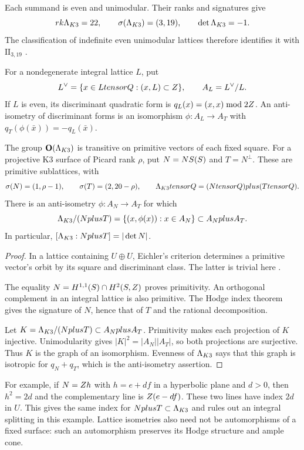 \begin{verification}[K3 invariants]
\label{ver:K3-invariants}
Each summand is even and unimodular.  Their ranks and signatures give
\[
rk\Lambda_{K3}=22,\qquad
\sigma(\Lambda_{K3})=(3,19),\qquad \det\Lambda_{K3}=-1.
\]
The classification of indefinite even unimodular lattices therefore
identifies it with $\mathrm{II}_{3,19}$
\cite[Chapter~14, \S1]{HuybrechtsK3}.
\end{verification}

For a nondegenerate integral lattice $L$, put
\[
L^\vee=\{x\in LtensorQ:(x,L)\subset Z\},\qquad A_L=L^\vee/L.
\]
If $L$ is even, its discriminant quadratic form is
$q_L(x)=(x,x)\bmod 2Z$.  An anti-isometry of discriminant forms
is an isomorphism $\phi:A_L\to A_T$ with
$q_T(\phi(\bar x))=-q_L(\bar x)$.

\begin{proposition}
\label{prop:K3-aut}
The group $\mathbf{O}(\Lambda_{K3})$ is transitive on primitive vectors of each
fixed square.  For a projective K3 surface of Picard rank $\rho$,
put $N=NS(S)$ and $T=N^\perp$.  These are primitive sublattices, with
\[
\sigma(N)=(1,\rho-1),\qquad \sigma(T)=(2,20-\rho),
\qquad
\Lambda_{K3}tensorQ=(NtensorQ)plus(TtensorQ).
\]
There is an anti-isometry $\phi:A_N\to A_T$ for which
\[
\Lambda_{K3}/(Nplus T)
=\{(x,\phi(x)):x\in A_N\}
\subset A_Nplus A_T.
\]
In particular, $[\Lambda_{K3}:Nplus T]=|\det N|$.
\end{proposition}

\begin{proof}
In a lattice containing $U\oplus U$, Eichler's criterion determines
a primitive vector's orbit by its square and discriminant class.  The
latter is trivial here \cite[Chapter~14, Corollary~1.10]{HuybrechtsK3}.

The equality $N=H^{1,1}(S)\cap H^2(S,Z)$ proves primitivity.
An orthogonal complement in an integral lattice is also primitive.  The Hodge index theorem gives the signature of $N$, hence
that of $T$ and the rational decomposition.

Let $K=\Lambda_{K3}/(Nplus T)\subset A_Nplus A_T$.  Primitivity makes
each projection of $K$ injective.  Unimodularity gives
$|K|^2=|A_N||A_T|$, so both projections are surjective.  Thus $K$ is
the graph of an isomorphism.  Evenness of $\Lambda_{K3}$ says that this
graph is isotropic for $q_N+q_T$, which is the anti-isometry assertion.
\end{proof}

For example, if $N=Z h$ with $h=e+df$ in a hyperbolic plane and
$d>0$, then $h^2=2d$ and the complementary line is $Z(e-df)$.
These two lines have index $2d$ in $U$.  This gives the same index
for $Nplus T\subset\Lambda_{K3}$ and rules out an integral splitting
in this example.  Lattice isometries also need not be automorphisms
of a fixed surface: such an automorphism preserves its Hodge
structure and ample cone.

